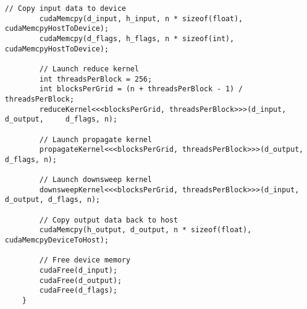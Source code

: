 \documentclass{article}
\begin{document}
\begin{lstlisting}[basicstyle=\small\ttfamily, breaklines=true]
        // Copy input data to device
        cudaMemcpy(d_input, h_input, n * sizeof(float),     cudaMemcpyHostToDevice);
        cudaMemcpy(d_flags, h_flags, n * sizeof(int), cudaMemcpyHostToDevice);

        // Launch reduce kernel
        int threadsPerBlock = 256;
        int blocksPerGrid = (n + threadsPerBlock - 1) / threadsPerBlock;
        reduceKernel<<<blocksPerGrid, threadsPerBlock>>>(d_input, d_output,     d_flags, n);

        // Launch propagate kernel
        propagateKernel<<<blocksPerGrid, threadsPerBlock>>>(d_output,   d_flags, n);

        // Launch downsweep kernel
        downsweepKernel<<<blocksPerGrid, threadsPerBlock>>>(d_input,    d_output, d_flags, n);

        // Copy output data back to host
        cudaMemcpy(h_output, d_output, n * sizeof(float),   cudaMemcpyDeviceToHost);

        // Free device memory
        cudaFree(d_input);
        cudaFree(d_output);
        cudaFree(d_flags);
    }

\end{lstlisting}
\end{document}

